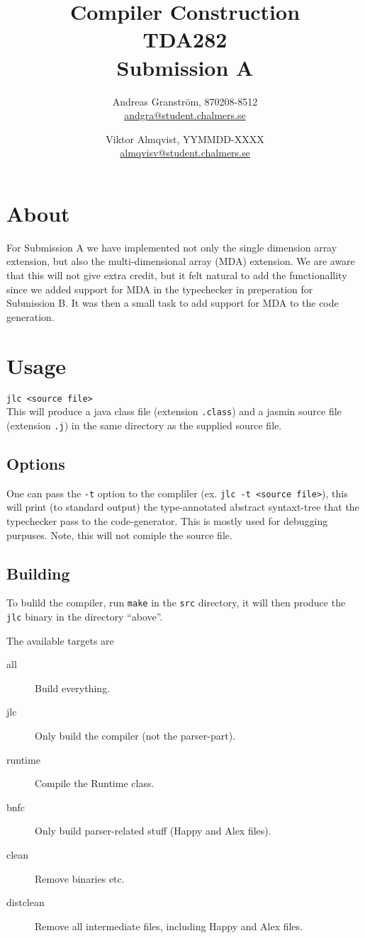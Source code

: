 \documentclass[a4paper,10pt]{article}
\title{{\sc Compiler Construction}\\ TDA282 \\ Submission A}
\author{Andreas Granstr\"om, 870208-8512 \\ \url{andgra@student.chalmers.se} \and Viktor Almqvist, YYMMDD-XXXX \\ \url{almqvisv@student.chalmers.se}}
\begin{document}
\maketitle


\section{About}
For Submission A we have implemented not only the single dimension
array extension, but also the multi-dimensional array (MDA)
extension. We are aware that this will not give extra credit, but it
felt natural to add the functionallity since we added support for MDA
in the typechecker in preperation for Submission B. It was then a
small task to add support for MDA to the code generation.

\section{Usage}
\texttt{jlc <source file>} \\ This will produce a java class file
(extension \texttt{.class}) and a jasmin source file (extension
\texttt{.j}) in the same directory as the supplied source file.

\subsection{Options}
One can pass the \texttt{-t} option to the compliler (ex. \texttt{jlc
  -t <source file>}), this will print (to standard output) the
type-annotated abstract syntaxt-tree that the typechecker pass to the
code-generator. This is mostly used for debugging purpuses. Note, this
will not comiple the source file.

\subsection{Building}
To bulild the compiler, run \texttt{make} in the \texttt{src} directory, it will then produce the \texttt{jlc} binary in the directory ``above''.

The available targets are
\begin{description}
\item[all] Build everything.
\item[jlc] Only build the compiler (not the parser-part).
\item[runtime] Compile the Runtime class.
\item[bnfc] Only build parser-related stuff (Happy and Alex files).
\item[clean] Remove binaries etc.
\item[distclean] Remove all intermediate files, including Happy and Alex files.

\end{description}
\end{document}

